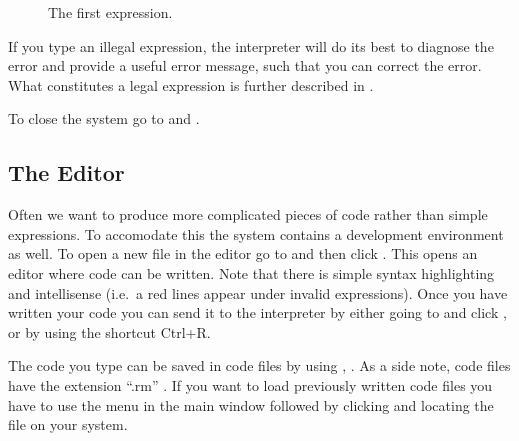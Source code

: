\documentclass[a4,14pt,latin1]{article}
\begin{document}
\begin{figure}
  \centering
  \caption{The first \RAS{} expression.}
  \label{fig:first_exp}
\end{figure}


If you type an illegal expression, the \RAS{} interpreter will do its
best to diagnose the error and provide a useful error message, such
that you can correct the error. What constitutes a legal expression is
further described in .

To close the \RAS{} system go to  and .

\subsection{The Editor}

Often we want to produce more complicated pieces of code rather than
simple expressions. To accomodate this the \RAS{} system contains a
development environment as well. To open a new file in the editor go
to  and then click . This opens an editor where
\RAS{} code can be written. Note that there is simple syntax
highlighting and intellisense (i.e.\ a red lines appear under invalid
expressions). Once you have written your code you can send it to the
interpreter by either going to  and click , or by
using the shortcut Ctrl+R.

The code you type can be saved in \RAS{} code files by using
, . As a side note, \RAS{} code files have the
extension ``.rm'' . If you want to load previously written \RAS{} code
files you have to use the  menu in the main window followed
by clicking  and locating the file on your system.
\end{document}

